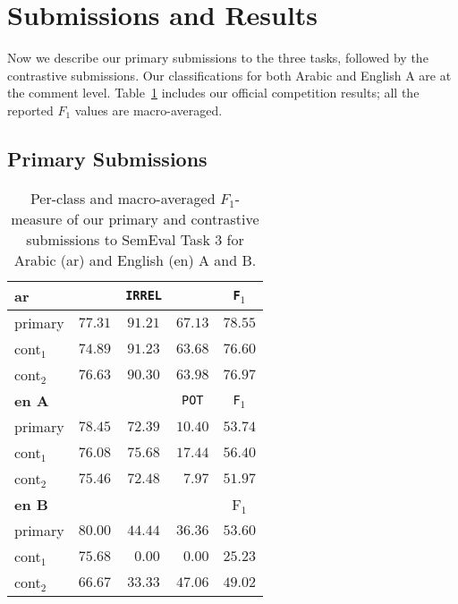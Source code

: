 \section{Submissions and Results}
\label{sec:experiments}

Now we describe our primary submissions to the three tasks, followed by the 
contrastive submissions. Our classifications for both Arabic and English A are at the comment level. Table~\ref{tab:results} includes our official competition results; all the reported $F_1$ values are macro-averaged.

\subsection{Primary Submissions}


\begin{table}%
\centering
\footnotesize
\begin{tabular}{|l|cccc|}
  \hline
  \bf ar	& \dir & \texttt{IRREL} & \rel & \texttt{F$_1$}\\  \hline  
  primary	& $77.31$ & $91.21$	& $67.13$	&  $78.55$ \\
  cont$_1$	& $74.89$ & $91.23$	& $63.68$	&  $76.60$ \\
  cont$_2$	& $76.63$ & $90.30$	& $63.98$	& $76.97$ \\  
  \hline \hline

  \bf en A	& \good   & \bad 	& \texttt{POT}	& \texttt{F$_1$}\\\hline
  primary	& $78.45$ & $72.39$	& $10.40$	& $53.74$ \\
  cont$_1$ 	& $76.08$ & $75.68$	& $17.44$	& $56.40$ \\
  cont$_2$ 	& $75.46$ & $72.48$ 	& $\,\,\,7.97$	& $51.97$ \\
\hline  \hline

\bf en B	& \yes	  & \no		& \unsure	& F$_1$	 \\
  \hline  
  primary	& $80.00$ & $44.44$	& $36.36$	& $53.60$ \\
  cont$_1$ 	& $75.68$ & $\,\,\,0.00$& $\,\,\,0.00$	& $25.23$ \\
  cont$_2$ 	& $66.67$ & $33.33$ 	& $47.06$	& $49.02$ \\
  \hline
 \end{tabular}
\caption{Per-class and macro-averaged $F_1$-measure of our primary and 
contrastive submissions to SemEval Task 3 for Arabic (ar) and English 
(en) A and B.
\label{tab:results}}
\end{table}

